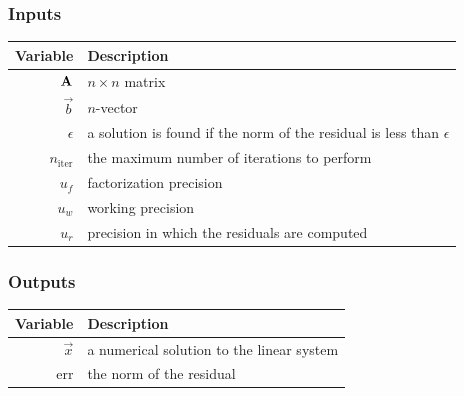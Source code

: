 \documentclass[t,12pt,numbers,fleqn]{beamer}
\begin{document}

\begin{frame}
\frametitle{Inputs}

\begin{table}[hp]
  \centering
  \label{tab:inputs}
  \begin{tabularx}{1.0\linewidth}{rX}
    \toprule
    \textbf{Variable}  & \textbf{Description} \\
    \midrule
    \(\mathbf{A}\) & \(n \times n\) matrix \\
    \(\vec{b}\)        & \(n\)-vector \\
    \(\epsilon\)        & a solution is found if the norm of the residual is less than \(\epsilon\) \\
    \(n_\mathrm{iter}\) & the maximum number of iterations to perform \\
    \(u_f\)       & factorization precision \\
    \(u_w\)       & working precision \\
    \(u_r\)       & precision in which the residuals are computed \\
    \bottomrule
  \end{tabularx}
\end{table}

\end{frame}


\begin{frame}
\frametitle{Outputs}

\begin{table}[hp]
  \centering
  \label{tab:inputs}
  \begin{tabularx}{1.0\linewidth}{rX}
    \toprule
    \textbf{Variable} & \textbf{Description} \\
    \midrule
    \(\vec{x}\)       & a numerical solution to the linear system \\
    \(\mathrm{err}\)  & the norm of the residual \\
    \bottomrule
  \end{tabularx}
\end{table}

\end{frame}

\end{document}
